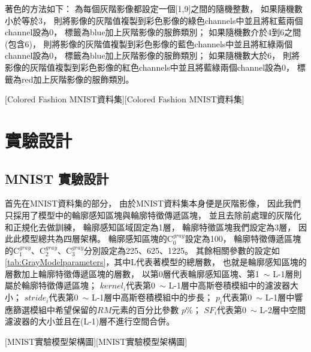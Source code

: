 \documentclass[class=NCU\_thesis, crop=false]{standalone}
\begin{document}
    著色的方法如下：
    為每個灰階影像都設定一個[1,9]之間的隨機整數，
    如果隨機數小於等於3，
    則將影像的灰階值複製到彩色影像的綠色channels中並且將紅藍兩個channel設為0，
    標籤為blue加上灰階影像的服飾類別；
    如果隨機數介於4到6之間(包含6)，
    則將影像的灰階值複製到彩色影像的藍色channels中並且將紅綠兩個channel設為0，
    標籤為blue加上灰階影像的服飾類別；
    如果隨機數大於6，
    則將影像的灰階值複製到彩色影像的紅色channels中並且將藍綠兩個channel設為0，
    標籤為red加上灰階影像的服飾類別。

    [Colored Fashion MNIST資料集][Colored Fashion MNIST資料集]
    \pagebreak
\section{實驗設計}
    \subsection{MNIST 實驗設計}
    首先在MNIST資料集的部分，
    由於MNIST資料集本身便是灰階影像，
    因此我們只採用了模型中的輪廓感知區塊與輪廓特徵傳遞區塊，
    並且去除前處理的灰階化和正規化去做訓練，
    輪廓感知區域固定為1層，
    輪廓特徵區塊我們設定為3層，
    因此此模型總共為四層架構。
    輪廓感知區塊的C$^{gray}_{0}$設定為100，
    輪廓特徵傳遞區塊的C$^{gray}_{1}$、C$^{gray}_{2}$、C$^{gray}_{3}$分別設定為225、625、1225。
    其餘相關參數的設定如\cref{tab:GrayModelparameters}，其中L代表著模型的總層數，
    也就是輪廓感知區塊的層數加上輪廓特徵傳遞區塊的層數，
    以第0層代表輪廓感知區塊、第1~$\sim$ L-1層則屬於輪廓特徵傳遞區塊；
    $kernel_{i}$代表第0~$\sim$ L-1層中高斯卷積模組中的濾波器大小；
    $stride_{i}$代表第0~$\sim$ L-1層中高斯卷積模組中的步長；
    $p_{i}$代表第0~$\sim$ L-1層中響應篩選模組中希望保留的$RM$元素的百分比參數 $p\%$；
    $SF_{i}$代表第0~$\sim$ L-2層中空間濾波器的大小並且在(L-1)層不進行空間合併。

    [MNIST實驗模型架構圖][MNIST實驗模型架構圖]
\end{document}
